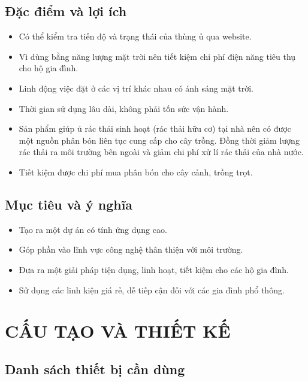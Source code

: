 \documentclass[12pt, a4paper]{article}
\begin{document}
\subsection{Đặc điểm và lợi ích}
\begin{itemize}
    \item Có thể kiểm tra tiến độ và trạng thái của thùng ủ qua website. 
    \item Vì dùng bằng năng lượng mặt trời nên tiết kiệm chi phí điện năng tiêu thụ cho hộ gia đình.
    \item Linh động việc đặt ở các vị trí khác nhau có ánh sáng mặt trời.
    \item Thời gian sử dụng lâu dài, không phải tốn sức vận hành.
    \item Sản phẩm giúp ủ rác thải sinh hoạt (rác thải hữu cơ) tại nhà nên có được một nguồn phân bón liên tục cung cấp cho cây trồng. Đồng thời giảm lượng rác thải ra môi trường bên ngoài và giảm chi phí xử lí rác thải của nhà nước.
    \item Tiết kiệm được chi phí mua phân bón cho cây cảnh, trồng trọt.
\end{itemize}

\subsection{Mục tiêu và ý nghĩa}
\begin{itemize}
    \item Tạo ra một dự án có tính ứng dụng cao. 
    \item Góp phần vào lĩnh vực công nghệ thân thiện với môi trường. 
    \item Đưa ra một giải pháp tiện dụng, linh hoạt, tiết kiệm cho các hộ gia đình. 
    \item Sử dụng các linh kiện giá rẻ, dễ tiếp cận đối với các gia đình phổ thông. 
\end{itemize}

\section{CẤU TẠO VÀ THIẾT KẾ}
\subsection{Danh sách thiết bị cần dùng}
\end{document}
